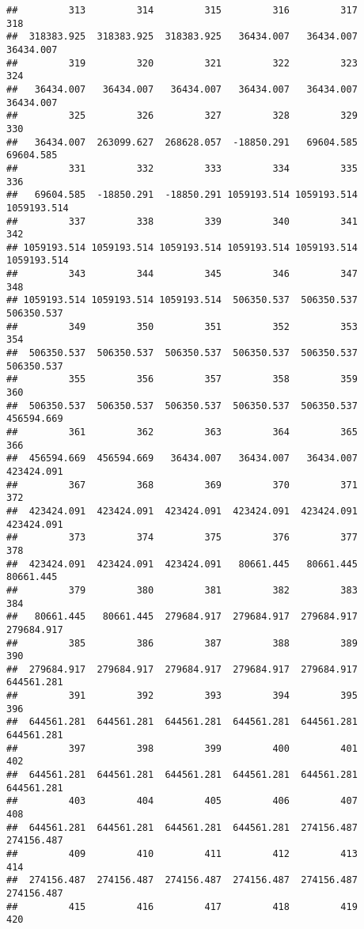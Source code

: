 \documentclass[
]{book}
\begin{document}
\begin{verbatim}
##         313         314         315         316         317         318 
##  318383.925  318383.925  318383.925   36434.007   36434.007   36434.007 
##         319         320         321         322         323         324 
##   36434.007   36434.007   36434.007   36434.007   36434.007   36434.007 
##         325         326         327         328         329         330 
##   36434.007  263099.627  268628.057  -18850.291   69604.585   69604.585 
##         331         332         333         334         335         336 
##   69604.585  -18850.291  -18850.291 1059193.514 1059193.514 1059193.514 
##         337         338         339         340         341         342 
## 1059193.514 1059193.514 1059193.514 1059193.514 1059193.514 1059193.514 
##         343         344         345         346         347         348 
## 1059193.514 1059193.514 1059193.514  506350.537  506350.537  506350.537 
##         349         350         351         352         353         354 
##  506350.537  506350.537  506350.537  506350.537  506350.537  506350.537 
##         355         356         357         358         359         360 
##  506350.537  506350.537  506350.537  506350.537  506350.537  456594.669 
##         361         362         363         364         365         366 
##  456594.669  456594.669   36434.007   36434.007   36434.007  423424.091 
##         367         368         369         370         371         372 
##  423424.091  423424.091  423424.091  423424.091  423424.091  423424.091 
##         373         374         375         376         377         378 
##  423424.091  423424.091  423424.091   80661.445   80661.445   80661.445 
##         379         380         381         382         383         384 
##   80661.445   80661.445  279684.917  279684.917  279684.917  279684.917 
##         385         386         387         388         389         390 
##  279684.917  279684.917  279684.917  279684.917  279684.917  644561.281 
##         391         392         393         394         395         396 
##  644561.281  644561.281  644561.281  644561.281  644561.281  644561.281 
##         397         398         399         400         401         402 
##  644561.281  644561.281  644561.281  644561.281  644561.281  644561.281 
##         403         404         405         406         407         408 
##  644561.281  644561.281  644561.281  644561.281  274156.487  274156.487 
##         409         410         411         412         413         414 
##  274156.487  274156.487  274156.487  274156.487  274156.487  274156.487 
##         415         416         417         418         419         420 

\end{verbatim}
\end{document}
